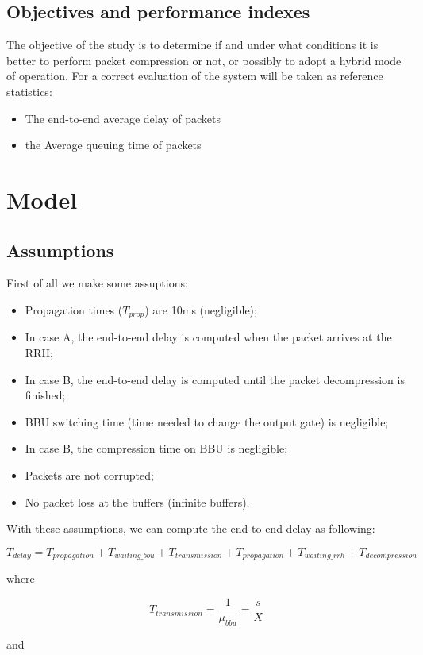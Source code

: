 \documentclass[11pt,a4paper,oneside, openright]{article}
\begin{document}
\subsection{Objectives and performance indexes}
The objective of the study is to determine if and under what conditions it is better to perform packet compression or not, or possibly to adopt a hybrid mode of operation.
For a correct evaluation of the system will be taken as reference statistics:
\begin{itemize}
	\item The end-to-end average delay of packets
	\item the Average queuing time of packets
\end{itemize}


\section{Model}

\subsection{Assumptions}
First of all we make some assuptions:
\begin{itemize}
    \item Propagation times ($ T_{prop} $) are 10ms (negligible);
    \item In case A, the end-to-end delay is computed when the packet arrives at the RRH;
    \item In case B, the end-to-end delay is computed until the packet decompression is finished;
    \item BBU switching time (time needed to change the output gate) is negligible;
    \item In case B, the compression time on BBU is negligible;
    \item Packets are not corrupted;
    \item No packet loss at the buffers (infinite buffers).
\end{itemize}

With these assumptions, we can compute the end-to-end delay as following:

$$ T_{delay} =  T_{propagation} + T_{waiting\_bbu} + T_{transmission} + T_{propagation} + T_{waiting\_rrh} + T_{decompression} $$

where 

$$ T_{transmission} = \frac{1}{\mu_{bbu}} = \frac{s}{X} $$

and
\end{document}
